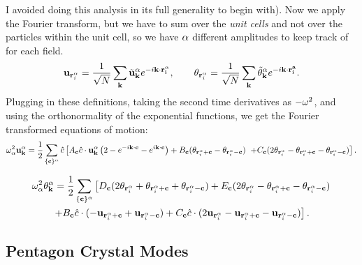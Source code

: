 \documentclass[12pt]{article}
\begin{document}
I avoided doing this analysis in its full generality to begin with). Now we 
apply the Fourier transform, but we have to sum over the \emph{unit cells} and 
not over the particles within the unit cell, so we have $\alpha$ different 
amplitudes to keep track of for each field.
\[ \mathbf{u}_{\mathbf{r}_i^\alpha} = \frac{1}{\sqrt{N}} \sum_{\mathbf{k}} \tilde{\mathbf{u}}_{\mathbf{k}}^\alpha 
e^{-i \mathbf{k}\cdot\mathbf{\mathbf{r}_i^\alpha} }, \qquad \mathbf{\theta}_{\mathbf{r}_i^\alpha} = \frac{1}{\sqrt N} \sum_{\mathbf{k}} \tilde{\theta}_{\mathbf{k}}^\alpha e^{-i\mathbf{k}\cdot\mathbf{\mathbf{r}_i^a} }.\]
Plugging in these definitions, taking the second time derivatives as $-\omega^2$, 
and using the orthonormality of the exponential functions, we get the Fourier 
transformed equations of motion:
\[ \omega^2_\alpha {\mathbf{u}}^\alpha_{\mathbf{k}} = \frac{1}{2} \sum_{\{\mathbf{c}\}^\alpha} \hat c  \left [   A_{\mathbf{c}} \hat c \cdot \mathbf{u}_{\mathbf{k}}^\alpha 
\left( 2 - e^{-i\mathbf{k}\cdot\mathbf{c}} - e^{i\mathbf{k}\cdot\mathbf{c}} \right)  + 
B_{\mathbf{c}}(\theta_{\mathbf{r}_i^\alpha + \mathbf{c}} - \theta_{\mathbf{r}_i^\alpha - \mathbf{c}}) 
\right. \\ \left.+ C_{\mathbf{c}} (2\theta_{\mathbf{r}_i^\alpha} - \theta_{\mathbf{r}_i^\alpha +\mathbf{c}} 
- \theta_{\mathbf{r}_i^\alpha - \mathbf{c}})   \right].\]

\begin{multline*}   \omega_\alpha^2 \theta^\alpha_{\mathbf{k}} = \frac{1}{2} \sum_{\{\mathbf{c}\}^\alpha} 
\left [ D_{\mathbf{c}} (2\theta_{\mathbf{r}_i^\alpha} + \theta_{\mathbf{r}_i^\alpha + \mathbf{c}} + 
\theta_{\mathbf{r}_i^\alpha - \mathbf{c}}) + E_{\mathbf{c}}(2\theta_{\mathbf{r}_i^\alpha} - \theta_{\mathbf{r}_i^\alpha + 
\mathbf{c}} - \theta_{\mathbf{r}_i^\alpha - \mathbf{c}}) \right. \\ \left. + B_{\mathbf{c}} 
\hat c \cdot (- \mathbf{u}_{\mathbf{r}_i^\alpha + \mathbf{c}} + \mathbf{u}_{\mathbf{r}_i^\alpha - \mathbf{c}}) + C_{\mathbf{c}} \hat c \cdot (2\mathbf{u}_{\mathbf{r}_i^\alpha} - \mathbf{u}_{\mathbf{r}_i^\alpha 
+ \mathbf{c}} - \mathbf{u}_{\mathbf{r}_i^\alpha - \mathbf{c}}) \right ]. \end{multline*}

\subsection{Pentagon Crystal Modes}





\end{document}
